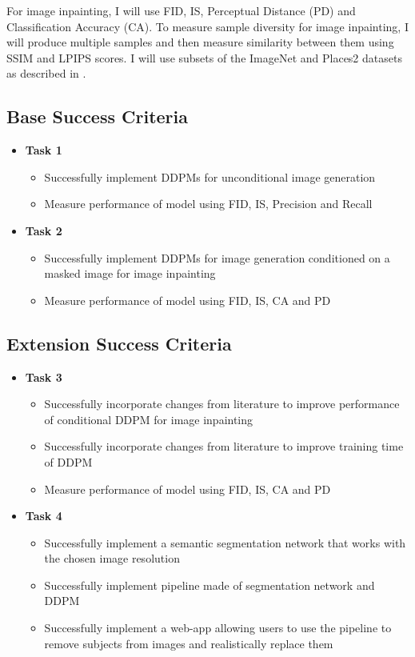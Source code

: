 \documentclass{article}
\begin{document}
For image inpainting, I will use FID, IS, Perceptual Distance (PD) and Classification Accuracy (CA). To measure sample diversity for image inpainting, I will produce multiple samples and then measure similarity between them using SSIM and LPIPS scores. I will use subsets of the ImageNet and Places2 datasets as described in \cite{Saharia-2022}.

\subsection{Base Success Criteria}

\begin{itemize}
    \item \textbf{Task 1}
    \begin{itemize}
        \item Successfully implement DDPMs for unconditional image generation
        \item Measure performance of model using FID, IS, Precision and Recall
    \end{itemize}
    \item \textbf{Task 2}
    \begin{itemize}
        \item Successfully implement DDPMs for image generation conditioned on a masked image for image inpainting
        \item Measure performance of model using FID, IS, CA and PD
    \end{itemize}
\end{itemize}

\subsection{Extension Success Criteria}

\begin{itemize}
    \item \textbf{Task 3}
    \begin{itemize}
        \item Successfully incorporate changes from literature to improve performance of conditional DDPM for image inpainting
        \item Successfully incorporate changes from literature to improve training time of DDPM
        \item Measure performance of model using FID, IS, CA and PD
    \end{itemize}
    \item \textbf{Task 4}
    \begin{itemize}
        \item Successfully implement a semantic segmentation network that works with the chosen image resolution
        \item Successfully implement pipeline made of segmentation network and DDPM
        \item Successfully implement a web-app allowing users to use the pipeline to remove subjects from images and realistically replace them
    \end{itemize}
\end{itemize}
\end{document}
